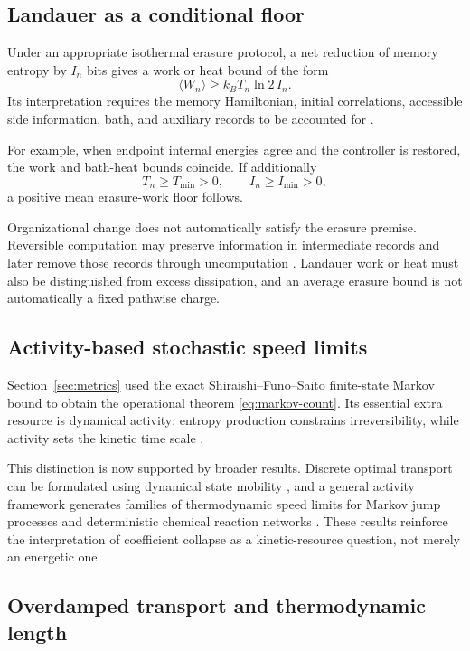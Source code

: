 \documentclass[11pt,a4paper]{article}
\theoremstyle{definition}
\numberwithin{equation}{section}
\begin{document}
\subsection*{Landauer as a conditional floor}

Under an appropriate isothermal erasure protocol, a net reduction
of memory entropy by $I_n$ bits gives a work or heat bound of the
form
\[
\langle W_n\rangle
\ge k_BT_n\ln2\,I_n.
\]
Its interpretation requires the memory Hamiltonian, initial
correlations, accessible side information, bath, and auxiliary
records to be accounted for
\cite{Landauer1961,ReebWolf2014}.

For example, when endpoint internal energies agree and the
controller is restored, the work and bath-heat bounds coincide.
If additionally
\[
T_n\ge T_{\min}>0,\qquad I_n\ge I_{\min}>0,
\]
a positive mean erasure-work floor follows.

Organizational change does not automatically satisfy the
erasure premise. Reversible computation may preserve
information in intermediate records and later remove those
records through uncomputation \cite{Bennett1973,Bennett1989}.
Landauer work or heat must also be distinguished from excess
dissipation, and an average erasure bound is not automatically
a fixed pathwise charge.

\subsection*{Activity-based stochastic speed limits}

Section~\ref{sec:metrics} used the exact Shiraishi--Funo--Saito
finite-state Markov bound to obtain the operational theorem
\eqref{eq:markov-count}. Its essential extra resource is dynamical
activity: entropy production constrains irreversibility, while activity
sets the kinetic time scale \cite{Shiraishi2018}.

This distinction is now supported by broader results. Discrete optimal
transport can be formulated using dynamical state mobility
\cite{VuSaito2023}, and a general activity framework generates families of
thermodynamic speed limits for Markov jump processes and deterministic
chemical reaction networks \cite{Nagayama2025}. These results reinforce the
interpretation of coefficient collapse as a kinetic-resource question, not
merely an energetic one.

\subsection*{Overdamped transport and thermodynamic length}
\end{document}
